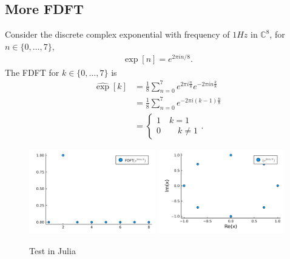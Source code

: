 \documentclass[a4paper]{article}
\begin{document}
\subsection{More FDFT}
Consider the discrete complex exponential with frequency of $1Hz$ in
$\mathbb{C}^8$, for $n \in \{0, \dots , 7\}$,
\begin{align}
    \exp[n] = e^{2\pi i n/8}.
\end{align}
The FDFT for $k \in \{0, \dots, 7\}$ is
\begin{align}
    \hat{\exp}[k] &= \frac{1}{8}\sum_{n=0}^7 e^{2\pi i \frac{n}{8}}e^{-2\pi i
    n \frac{k}{8}} \\
                  &= \frac{1}{8} \sum_{n=0}^7e^{-2\pi i (k-1)\frac{n}{8}}\\
                  &=
                  \begin{cases}
                      1\quad k=1\\
                      0 \qquad k\neq 1
                   \end{cases}.
\end{align}
\begin{figure}[H]
    \centering
    \includegraphics[width=0.49\textwidth]{./fdft.png}
    \includegraphics[width=0.49\textwidth]{./normal.png}
    \caption{Test in Julia}
\end{figure}
\end{document}
